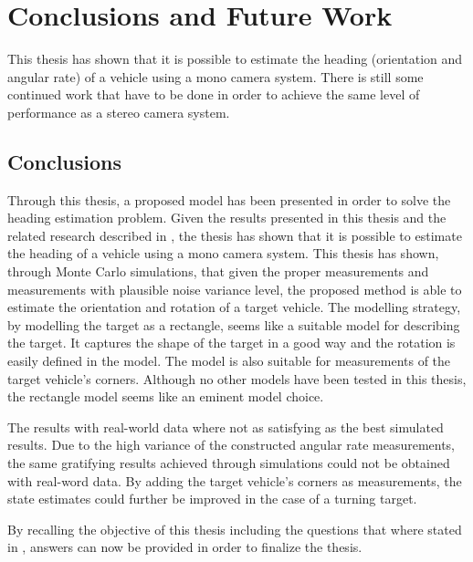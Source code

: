 \chapter{Conclusions and Future Work}
\label{cha:conclusions}

This thesis has shown that it is possible to estimate the heading (orientation and angular rate) of a vehicle using a mono camera system.
There is still some continued work that have to be done in order to achieve the same level of performance as a stereo camera system.

\section{Conclusions}
Through this thesis, a proposed model has been presented in order to solve the heading estimation problem.
Given the results presented in this thesis and the related research described in , the thesis has shown that it is possible to estimate the heading of a vehicle using a mono camera system.
This thesis has shown, through Monte Carlo simulations, that given the proper measurements and measurements with plausible noise variance level, the proposed method is able to estimate the orientation and rotation of a target vehicle.
The modelling strategy, by modelling the target as a rectangle, seems like a suitable model for describing the target.
It captures the shape of the target in a good way and the rotation is easily defined in the model.
The model is also suitable for measurements of the target vehicle's corners.
Although no other models have been tested in this thesis, the rectangle model seems like an eminent model choice.

The results with real-world data where not as satisfying as the best simulated results.
Due to the high variance of the constructed angular rate measurements, the same gratifying results achieved through simulations could not be obtained with real-word data.
By adding the target vehicle's corners as measurements, the state estimates could further be improved in the case of a turning target.

\newpage

By recalling the objective of this thesis including the questions that where stated in , answers can now be provided in order to finalize the thesis.


